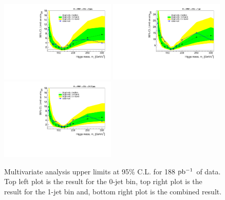 \begin{figure}[!htbp]
\begin{center}
   \includegraphics[width=0.49\textwidth]{figures/limits_0j_200pb_mva_1.pdf}
   \includegraphics[width=0.49\textwidth]{figures/limits_1j_200pb_mva_1.pdf}
   \includegraphics[width=0.49\textwidth]{figures/limits_nj_200pb_mva_1.pdf}
   \caption{Multivariate analysis upper limits at 95\% C.L. for 188 $\mathrm{pb^{-1}}$ of data. Top left plot 
   is the result for the 0-jet bin, top right plot is the result for the 1-jet bin and, 
   bottom right plot is the combined result.}
   \label{fig:mvabase_uls_data}
\end{center}
\end{figure}

